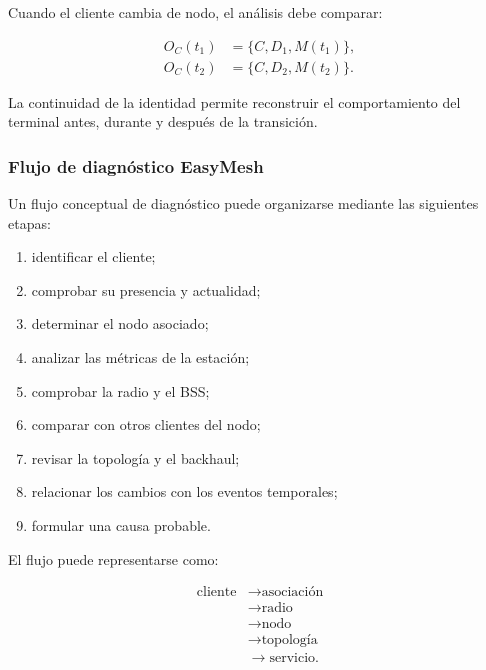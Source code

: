 Cuando el cliente cambia de nodo, el análisis debe comparar:

\[
\begin{aligned}
    O_C(t_1)
    &=
    \{
        C,
        D_1,
        M(t_1)
    \},\\
    O_C(t_2)
    &=
    \{
        C,
        D_2,
        M(t_2)
    \}.
\end{aligned}
\]

La continuidad de la identidad permite reconstruir el comportamiento del
terminal antes, durante y después de la transición.


\subsubsection*{Flujo de diagnóstico EasyMesh}

Un flujo conceptual de diagnóstico puede organizarse mediante las
siguientes etapas:

\begin{enumerate}
    \item identificar el cliente;

    \item comprobar su presencia y actualidad;

    \item determinar el nodo asociado;

    \item analizar las métricas de la estación;

    \item comprobar la radio y el BSS;

    \item comparar con otros clientes del nodo;

    \item revisar la topología y el backhaul;

    \item relacionar los cambios con los eventos temporales;

    \item formular una causa probable.
\end{enumerate}

El flujo puede representarse como:

\[
\begin{aligned}
    \text{cliente}
    &\longrightarrow
    \text{asociación}\\
    &\longrightarrow
    \text{radio}\\
    &\longrightarrow
    \text{nodo}\\
    &\longrightarrow
    \text{topología}\\
    &\longrightarrow
    \text{servicio}.
\end{aligned}
\]

